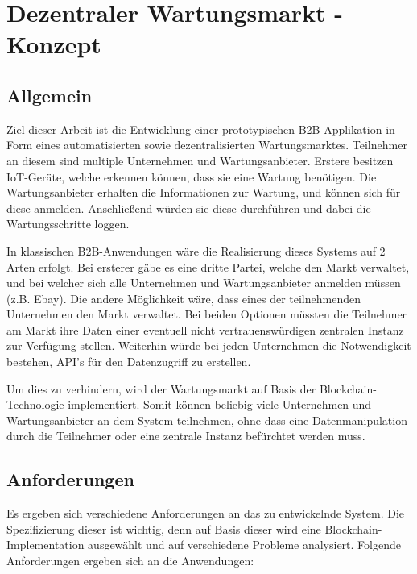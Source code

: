\chapter{Dezentraler Wartungsmarkt - Konzept}
\label{cha:concept}

\section{Allgemein}
Ziel dieser Arbeit ist die Entwicklung einer prototypischen B2B-Applikation in Form eines automatisierten sowie dezentralisierten Wartungsmarktes. Teilnehmer an diesem sind multiple Unternehmen und Wartungsanbieter. Erstere besitzen IoT-Geräte, welche erkennen können, dass sie eine Wartung benötigen. Die Wartungsanbieter erhalten die Informationen zur Wartung, und können sich für diese anmelden. Anschließend würden sie diese durchführen und dabei die Wartungsschritte loggen.  

In klassischen B2B-Anwendungen wäre die Realisierung dieses Systems auf 2 Arten erfolgt. Bei ersterer gäbe es eine dritte Partei, welche den Markt verwaltet, und bei welcher sich alle Unternehmen und Wartungsanbieter anmelden müssen (z.B. Ebay). Die andere Möglichkeit wäre, dass eines der teilnehmenden Unternehmen den Markt verwaltet. Bei beiden Optionen müssten die Teilnehmer am Markt ihre Daten einer eventuell nicht vertrauenswürdigen zentralen Instanz zur Verfügung stellen. Weiterhin würde bei jeden Unternehmen die Notwendigkeit bestehen, API's für den Datenzugriff zu erstellen.

Um dies zu verhindern, wird der Wartungsmarkt auf Basis der Blockchain-Technologie implementiert. Somit können beliebig viele Unternehmen und Wartungsanbieter an dem System teilnehmen, ohne dass eine Datenmanipulation durch die Teilnehmer oder eine zentrale Instanz befürchtet werden muss.


\section{Anforderungen}
\label{sec:requirements}
Es ergeben sich verschiedene Anforderungen an das zu entwickelnde System. Die Spezifizierung dieser ist wichtig, denn auf Basis dieser wird eine Blockchain-Implementation ausgewählt und auf verschiedene Probleme analysiert. Folgende Anforderungen ergeben sich an die Anwendungen:


